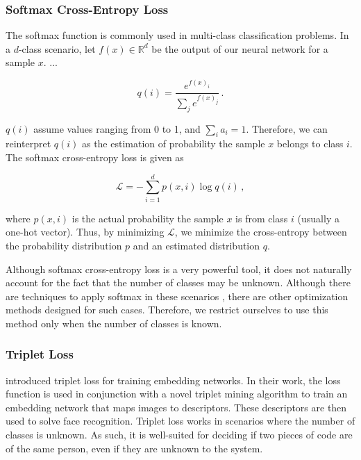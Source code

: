\subsubsection{Softmax Cross-Entropy Loss}\label{sec:softmax}

The softmax function is commonly used in multi-class classification problems. In a $d$-class scenario, let $f(x) \in \mathbb{R}^d$ be the output of our neural network for a sample $x$. ...

\begin{equation}
q(i) = \frac{e^{f(x)_i}}{\sum_j e^{f(x)_j}} \,.
\end{equation}

$q(i)$ assume values ranging from 0 to 1, and $\sum_i a_i = 1$. Therefore, we can reinterpret $q(i)$ as the estimation of probability the sample $x$ belongs to class $i$. The softmax cross-entropy loss is given as

\begin{equation}
\mathcal{L} = -\sum_{i=1}^d p(x, i) \log q(i) \,,
\end{equation}

where $p(x, i)$ is the actual probability the sample $x$ is from class $i$ (usually a one-hot vector). Thus, by minimizing $\mathcal{L}$, we minimize the cross-entropy between the probability distribution $p$ and an estimated distribution $q$.

Although softmax cross-entropy loss is a very powerful tool, it does not naturally account for the fact that the number of classes may be unknown. Although there are techniques to apply softmax in these scenarios \cite{softmax_trick1,softmax_trick2}, there are other optimization methods designed for such cases. Therefore, we restrict ourselves to use this method only when the number of classes is known.

\subsubsection{Triplet Loss}\label{sec:triplet}

 introduced triplet loss for training embedding networks. In their work, the loss function is used in conjunction with a novel triplet mining algorithm to train an embedding network that maps images to descriptors. These descriptors are then used to solve face recognition. Triplet loss works in scenarios where the number of classes is unknown. As such, it is well-suited for deciding if two pieces of code are of the same person, even if they are unknown to the system.


